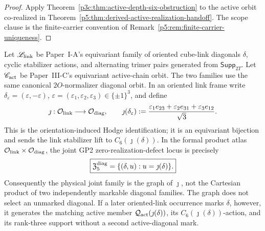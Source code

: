 \documentclass[12pt,a4paper]{article}
\begin{document}
\begin{proof}
Apply Theorem~\ref{p3c:thm:active-depth-six-obstruction} to the active orbit
co-realized in
Theorem~\ref{p5:thm:derived-active-realization-handoff}.  The scope clause is
the finite-carrier convention of
Remark~\ref{p5:rem:finite-carrier-uniqueness}.
\end{proof}

\begin{theorem}
\label{p5:thm:joint-link-active-orbit-matching}
Let \(\mathscr L_{\rm link}\) be Paper~I-A's equivariant family of oriented
cube-link diagonals \(\delta\), cyclic stabilizer actions, and alternating
trimer pairs generated from \(\mathsf{Supp}_{2T}\).  Let
\(\mathscr C_{\rm act}\) be Paper~III-C's equivariant active-chain orbit.
The two families use the same canonical \(2O\)-normalizer diagonal orbit.  In
an oriented link frame write
\(\delta_\varepsilon=(\varepsilon,-\varepsilon)\),
\(\varepsilon=(\varepsilon_1,\varepsilon_2,\varepsilon_3)\in\{\pm1\}^3\),
and define
\[
 \jmath:\mathcal O_{\rm link}\longrightarrow\mathcal O_{\rm diag},
 \qquad
 \jmath(\delta_\varepsilon)
 :=\frac{\varepsilon_1e_{23}+\varepsilon_2e_{31}
               +\varepsilon_3e_{12}}{\sqrt3}.
\]
This is the orientation-induced Hodge identification; it is an equivariant
bijection and sends the link stabilizer lift to
\(C_6(\jmath(\delta))\).  In the formal product atlas
\(\mathcal O_{\rm link}\times\mathcal O_{\rm diag}\), the joint GP2
zero-realization-defect locus is precisely
\[
 \boxed{
 \mathfrak Z_{5}^{\rm diag}
 =\{(\delta,u):u=\jmath(\delta)\}.}
\]
Consequently the physical joint family is the graph of \(\jmath\), not the
Cartesian product of two independently markable diagonal families.  The graph
does not select an unmarked diagonal.  If a later oriented-link occurrence
marks \(\delta\), however, it generates the matching active member
\(\mathcal Q_{\rm act}(\jmath(\delta))\), its
\(C_6(\jmath(\delta))\)-action, and its rank-three support without a second
active-diagonal mark.
\end{theorem}
\end{document}
